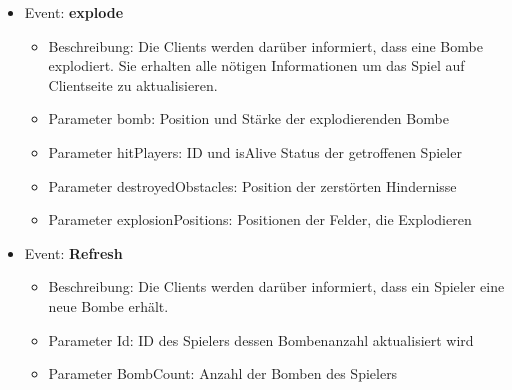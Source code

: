 \documentclass[conference]{IEEEtran}
\begin{document}
\begin{itemize}
\begin{itemize}
\end{itemize}

\item Event: \textbf{explode}
\begin{itemize}
\item Beschreibung:
    Die Clients werden darüber informiert, dass eine Bombe explodiert. Sie erhalten alle nötigen Informationen um das Spiel auf Clientseite zu aktualisieren.
    
\item Parameter \glqq bomb\grqq{}: Position und Stärke der explodierenden Bombe
\item Parameter \glqq hitPlayers\grqq{}: ID und isAlive Status der getroffenen Spieler
\item Parameter \glqq destroyedObstacles\grqq{}: Position der zerstörten Hindernisse
\item Parameter \glqq explosionPositions\grqq{}: 
Positionen der Felder, die Explodieren
\end{itemize}

\item Event: \textbf{Refresh}
\begin{itemize}
\item Beschreibung:
    Die Clients werden darüber informiert, dass ein Spieler eine neue Bombe erhält.
    
\item Parameter \glqq Id\grqq{}: ID des Spielers dessen Bombenanzahl aktualisiert wird
\item Parameter \glqq BombCount\grqq{}: Anzahl der Bomben des Spielers
\end{itemize}

\end{itemize}
\smallskip
\end{document}

